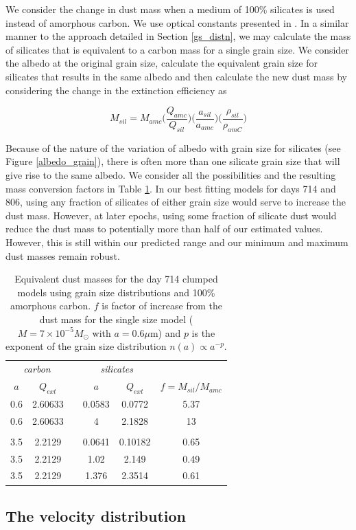 We consider the change in dust mass when a medium of 100\% silicates is used instead of amorphous carbon.  We use optical constants presented in \cite{Draine1984}.  In a similar manner to the approach detailed in Section \ref{gs_distn}, we may calculate the mass of silicates that is equivalent to a carbon mass for a single grain size.  We consider the albedo at the original grain size, calculate the equivalent grain size for silicates that results in the same albedo and then calculate the new dust mass by considering the change in the extinction efficiency as

\begin{equation}
M_{sil} = M_{amc} \Big( \frac{Q_{amc}}{Q_{sil}} \Big) \Big(\frac{a_{sil}}{a_{amc}}\Big) \Big(\frac{\rho_{sil}}{\rho_{amC}}\Big)
\end{equation}

Because of the nature of the variation of albedo with grain size for silicates (see Figure \ref{albedo_grain}), there is often more than one silicate grain size that will give rise to the same albedo.  We consider all the possibilities and the resulting mass conversion factors in Table \ref{tb_sil}.  In our best fitting models for days 714 and 806, using any fraction of silicates of either grain size would serve to increase the dust mass.  However, at later epochs, using some fraction of silicate dust would reduce the dust mass to potentially more than half of our estimated values. However, this is still within our predicted range and our minimum and maximum dust masses remain robust.

\begin{table}
	\caption{Equivalent dust masses for the day 714 clumped models using grain size distributions and 100\% amorphous carbon. $f$ is factor of increase from the dust mass for the single size model ($M=7 \times 10^{-5} M_{\odot}$ with $a=0.6 \mu$m) and $p$ is the exponent of the grain size distribution $n(a) \propto a^{-p}$.}
	\label{tb_sil}
	\begin{center}
  	\begin{tabular}{@{} cccccc @{}}
    	\hline
	\multicolumn{2}{c}{\textit{carbon}} && \multicolumn{2}{c}{\textit{silicates}} & \\
$a$ & $Q_{ext}$ & &$a$& $Q_{ext}$ & $f=M_{sil}/M_{amc}$ \\
\hline
0.6 & 2.60633 & &0.0583 & 0.0772 & 5.37 \\
0.6 & 2.60633 & &4 & 2.1828 & 13 \\
 \\
3.5 & 2.2129 & &0.0641 & 0.10182 & 0.65 \\
3.5 & 2.2129 & &1.02 & 2.149 & 0.49 \\
3.5 & 2.2129 & &1.376 & 2.3514 & 0.61 \\


    \hline
  \end{tabular}
  \end{center}
\end{table}

\subsection{The velocity distribution}
\label{scn:vel_prof}








